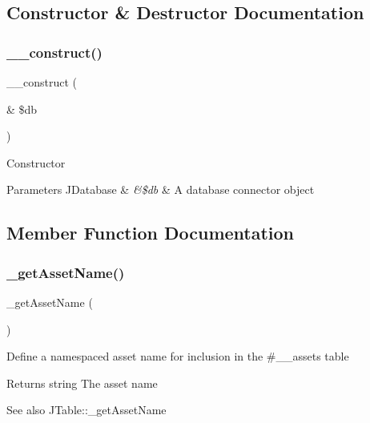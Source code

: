 \subsection{Constructor \& Destructor Documentation}
\mbox{\label{classtks__agenda_tablerecuritem_aaf2ef772755ec6f361d44e16cc9ffd69}} 
\subsubsection{\+\_\+\+\_\+construct()}
{\footnotesize\ttfamily \+\_\+\+\_\+construct (\begin{DoxyParamCaption}\item[{\&}]{\$db }\end{DoxyParamCaption})}

Constructor


\begin{DoxyParams}[1]{Parameters}
J\+Database & {\em \&\$db} & A database connector object \\
\hline
\end{DoxyParams}


\subsection{Member Function Documentation}
\mbox{\label{classtks__agenda_tablerecuritem_a6ebc41fa07c98f2a90c155ea1a2b200d}} 
\subsubsection{\+\_\+get\+Asset\+Name()}
{\footnotesize\ttfamily \+\_\+get\+Asset\+Name (\begin{DoxyParamCaption}{ }\end{DoxyParamCaption})\hspace{0.3cm}{\ttfamily [protected]}}

Define a namespaced asset name for inclusion in the \#\+\_\+\+\_\+assets table

\begin{DoxyReturn}{Returns}
string The asset name
\end{DoxyReturn}
\begin{DoxySeeAlso}{See also}
J\+Table\+::\+\_\+get\+Asset\+Name 
\end{DoxySeeAlso}
\mbox{\label{classtks__agenda_tablerecuritem_a82fd9fcd31dd6df6df45bd0a0146e832}} 
